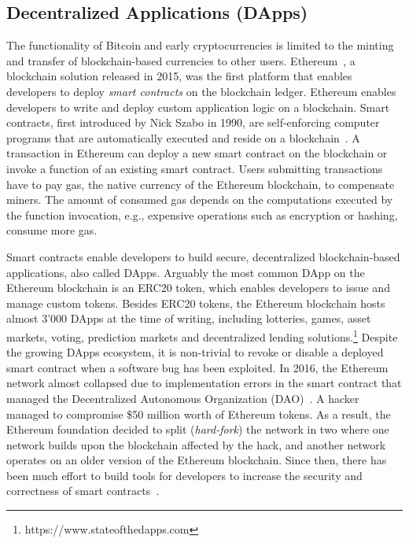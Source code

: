 \subsection{Decentralized Applications (DApps)}
The functionality of Bitcoin and early cryptocurrencies is limited to the minting and transfer of blockchain-based currencies to other users.
Ethereum~\cite{wood2014ethereum}, a blockchain solution released in 2015, was the first platform that enables developers to deploy \emph{smart contracts} on the blockchain ledger.
Ethereum enables developers to write and deploy custom application logic on a blockchain.
Smart contracts, first introduced by Nick Szabo in 1990, are self-enforcing computer programs that are automatically executed and reside on a blockchain~\cite{szabo1996smart}.
A transaction in Ethereum can deploy a new smart contract on the blockchain or invoke a function of an existing smart contract.
Users submitting transactions have to pay gas, the native currency of the Ethereum blockchain, to compensate miners.
The amount of consumed gas depends on the computations executed by the function invocation, e.g., expensive operations such as encryption or hashing, consume more gas.


Smart contracts enable developers to build secure, decentralized blockchain-based applications, also called DApps.
Arguably the most common DApp on the Ethereum blockchain is an ERC20 token, which enables developers to issue and manage custom tokens.
Besides ERC20 tokens, the Ethereum blockchain hosts almost 3'000 DApps at the time of writing, including lotteries, games, asset markets, voting, prediction markets and decentralized lending solutions.\footnote{https://www.stateofthedapps.com}
Despite the growing DApps ecosystem, it is non-trivial to revoke or disable a deployed smart contract when a software bug has been exploited.
In 2016, the Ethereum network almost collapsed due to implementation errors in the smart contract that managed the Decentralized Autonomous Organization (DAO)~\cite{mehar2019understanding}.
A hacker managed to compromise \$50 million worth of Ethereum tokens.
As a result, the Ethereum foundation decided to split (\emph{hard-fork}) the network in two where one network builds upon the blockchain affected by the hack, and another network operates on an older version of the Ethereum blockchain.
Since then, there has been much effort to build tools for developers to increase the security and correctness of smart contracts~\cite{breidenbach2018enter}.

